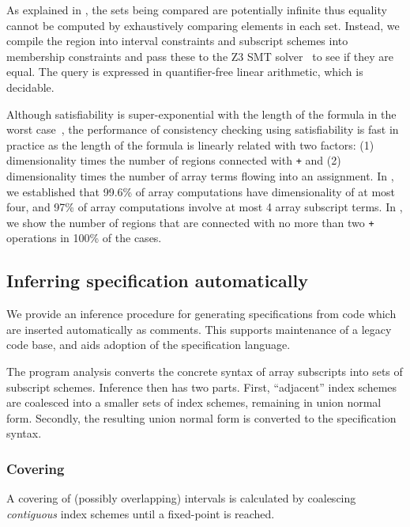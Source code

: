 As explained in , the sets being compared are
potentially infinite thus equality cannot be computed by exhaustively
comparing elements in each set. Instead, we compile the region into
interval constraints and subscript schemes into membership constraints and pass
these to the \textsc{Z3} SMT solver~\citep{de2008z3} to see if they are equal. The
query is expressed in quantifier-free linear arithmetic, which is decidable.

Although satisfiability is super-exponential with the length of the formula in
the worst case~\cite{fischer1974super}, the performance of consistency checking
using satisfiability is fast in practice as the length of the formula is linearly
related with two factors: (1) dimensionality times the number of regions connected
with \texttt{+} and (2) dimensionality times the number of array terms flowing
into an assignment. In , we
established that  99.6\% of array computations have 
dimensionality of at most four, and 97\% of array computations
involve at most 4 array subscript terms. In
, we show the number of regions that are
connected with no more than two \texttt{+} operations in 100\% of the cases.


\subsection{Inferring specification automatically}
\label{subsec:inference}
%
\noindent
We provide an inference procedure for generating specifications from
code which are inserted automatically as comments. This supports
maintenance of a legacy code base, and aids adoption of the
specification language. 

The program analysis converts the concrete syntax of
array subscripts into sets of subscript schemes. Inference then has
two parts. First, ``adjacent'' index schemes are coalesced into a
smaller sets of index schemes, remaining in union normal
form. Secondly, the resulting union normal form is converted to the
specification syntax.

\subsubsection{Covering}
A covering of (possibly overlapping) intervals is calculated
by coalescing \emph{contiguous} index schemes
until a fixed-point is reached.

